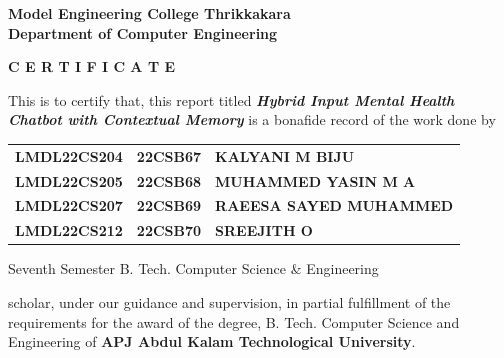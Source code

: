 \documentclass[11pt]{report}
\begin{document}
\begin{titlepage}
\begin{center}
\Large{\textbf{Model Engineering College Thrikkakara}}\\
\Large{\textbf{Department of Computer Engineering}}\\
\end{center}
\begin{figure}[h]
\begin{center}
\end{center}
\end{figure}
\begin{center}
\Large{\textbf{C E R T I F I C A T E}}\\
\vspace{.1in}
\end{center}
This is to certify that, this report titled  \textbf{\textit{Hybrid Input Mental Health Chatbot with Contextual Memory}} is a bonafide record of the work done by
\vspace{0.3cm}


\begin{center}
\begin{tabular}{lll}
\Large \textbf{LMDL22CS204} & \Large \textbf{22CSB67} & \Large \textbf{KALYANI M BIJU}\\
\Large \textbf{LMDL22CS205} & \Large \textbf{22CSB68} & \Large \textbf{MUHAMMED YASIN M A}\\
\Large \textbf{LMDL22CS207} & \Large \textbf{22CSB69} & \Large \textbf{RAEESA SAYED MUHAMMED}\\
\Large \textbf{LMDL22CS212} & \Large \textbf{22CSB70} & \Large \textbf{SREEJITH O}\\
\end{tabular}
\end{center}

\vspace{0.3cm}

\begin{center}
Seventh Semester B. Tech. Computer Science \& Engineering
\end{center}
scholar, under our guidance and supervision, in partial fulfillment of the requirements for the award of the degree, B. Tech. Computer Science and Engineering of \textbf{APJ Abdul Kalam Technological University}.
\\


\end{titlepage}
\end{document}
